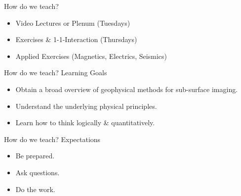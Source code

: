 \begin{frame}
    \small
    \begin{PointSix}{How do we teach? }
        \begin{itemize}
            \item Video Lectures or Plenum (Tuesdays)
            \item Exercises \& 1-1-Interaction (Thursdays)
            \item Applied Exercises (Magnetics, Electrics, Seismics)
        \end{itemize}
    \end{PointSix}
\end{frame}

\begin{frame}
    \begin{PointSix}{How do we teach?}
        \small
        \alert{Learning Goals}
        \begin{itemize}
            \item Obtain a broad overview of geophysical methods for sub-surface imaging.
            \item Understand the underlying physical principles.
            \item Learn how to think logically \& quantitatively.
        \end{itemize}
    \end{PointSix}
\end{frame}

\begin{frame}
    \begin{PointThree}{How do we teach?}
        \small
        \alert{Expectations}
        \begin{itemize}
            \item Be prepared.
            \item Ask questions.
            \item Do the work.
        \end{itemize}
    \end{PointThree}
\end{frame}

